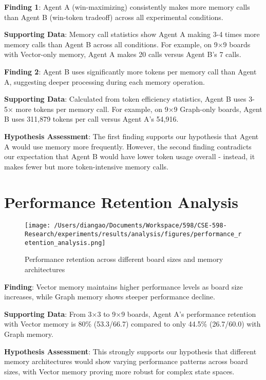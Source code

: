 \documentclass[10pt]{article}
\begin{document}
\small
\textbf{Finding 1}: Agent A (win-maximizing) consistently makes more memory calls than Agent B (win-token tradeoff) across all experimental conditions.

\textbf{Supporting Data}: Memory call statistics show Agent A making 3-4 times more memory calls than Agent B across all conditions. For example, on 9×9 boards with Vector-only memory, Agent A makes 20 calls versus Agent B's 7 calls.

\textbf{Finding 2}: Agent B uses significantly more tokens per memory call than Agent A, suggesting deeper processing during each memory operation.

\textbf{Supporting Data}: Calculated from token efficiency statistics, Agent B uses 3-5× more tokens per memory call. For example, on 9×9 Graph-only boards, Agent B uses 311,879 tokens per call versus Agent A's 54,916.

\textbf{Hypothesis Assessment}: The first finding supports our hypothesis that Agent A would use memory more frequently. However, the second finding contradicts our expectation that Agent B would have lower token usage overall - instead, it makes fewer but more token-intensive memory calls.

\section{Performance Retention Analysis}

\begin{figure}[t]
    \centering
    \texttt{[image: /Users/diangao/Documents/Workspace/598/CSE-598-Research/experiments/results/analysis/figures/performance\_retention\_analysis.png]}
    \caption{Performance retention across different board sizes and memory architectures}
    \label{fig:performance_retention}
\end{figure}

\small
\textbf{Finding}: Vector memory maintains higher performance levels as board size increases, while Graph memory shows steeper performance decline.

\textbf{Supporting Data}: From 3×3 to 9×9 boards, Agent A's performance retention with Vector memory is 80\% (53.3/66.7) compared to only 44.5\% (26.7/60.0) with Graph memory.

\textbf{Hypothesis Assessment}: This strongly supports our hypothesis that different memory architectures would show varying performance patterns across board sizes, with Vector memory proving more robust for complex state spaces.
\end{document}

